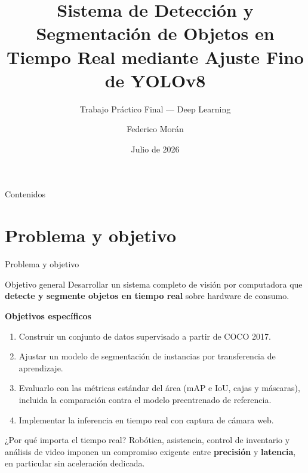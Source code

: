\documentclass[aspectratio=169,11pt]{beamer}
\title[Detección y segmentación en tiempo real]{Sistema de Detección y Segmentación de
Objetos en Tiempo Real mediante Ajuste Fino de YOLOv8}
\subtitle{Trabajo Práctico Final --- Deep Learning}
\author[Federico Morán]{Federico Morán}
\institute[Maestría en IA]{Maestría en Inteligencia Artificial}
\date{Julio de 2026}
\begin{document}
\begin{frame}[plain]
  \titlepage
\end{frame}

\begin{frame}{Contenidos}
  \tableofcontents
\end{frame}

\section{Problema y objetivo}

\begin{frame}{Problema y objetivo}
  \begin{block}{Objetivo general}
    Desarrollar un sistema completo de visión por computadora que \textbf{detecte y
    segmente objetos en tiempo real} sobre hardware de consumo.
  \end{block}

  \vspace{0.6em}
  \textbf{Objetivos específicos}
  \begin{enumerate}
    \item Construir un conjunto de datos supervisado a partir de COCO 2017.
    \item Ajustar un modelo de segmentación de instancias por transferencia de aprendizaje.
    \item Evaluarlo con las métricas estándar del área (mAP e IoU, cajas y máscaras),
          incluida la comparación contra el modelo preentrenado de referencia.
    \item Implementar la inferencia en tiempo real con captura de cámara web.
  \end{enumerate}

  \vspace{0.6em}
  \begin{alertblock}{¿Por qué importa el tiempo real?}
    Robótica, asistencia, control de inventario y análisis de video imponen un compromiso
    exigente entre \textbf{precisión} y \textbf{latencia}, en particular sin aceleración
    dedicada.
  \end{alertblock}
\end{frame}
\end{document}
